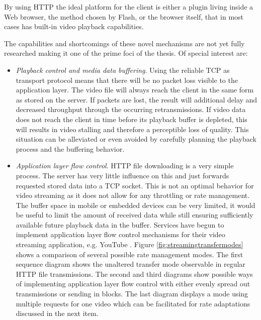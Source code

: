By using HTTP the ideal platform for the client is either a plugin living inside a Web browser, the method chosen by Flash, or the browser itself, that in most cases has built-in video playback capabilities.

The capabilities and shortcomings of these novel mechanisms are not yet fully researched making it one of the prime foci of the thesis. Of special interest are:
 
\begin{itemize}

\item \textit{Playback control and media data buffering}. Using the reliable TCP as transport protocol means that there will be no packet loss visible to the application layer. The video file will always reach the client in the same form as stored on the server. If packets are lost, the result will additional delay and decreased throughput through the occurring retransmissions. If video data does not reach the client in time before its playback buffer is depleted, this will results in video stalling and therefore a perceptible loss of quality. This situation can be alleviated or even avoided by carefully planning the playback process and the buffering behavior.

\item \textit{Application layer flow control}. HTTP file downloading is a very simple process. The server has very little influence on this and just forwards requested stored data into a TCP socket. This is not an optimal behavior for video streaming as it does not allow for any throttling or rate management. The buffer space in mobile or embedded devices can be very limited, it would be useful to limit the amount of received data while still ensuring sufficiently available future playback data in the buffer. Services have begun to implement application layer flow control mechanisms for their video streaming application, e.g. YouTube \cite{alcock2011application}. Figure \ref{fig:streamingtransfermodes} shows a comparison of several possible rate management modes. The first sequence diagram shows the unaltered transfer mode observable in regular HTTP file transmissions. The second and third diagrams show possible ways of implementing application layer flow control with either evenly spread out transmissions or sending in blocks. The last diagram displays a mode using multiple requests for one video which can be facilitated for rate adaptations discussed in the next item.


\end{itemize}
